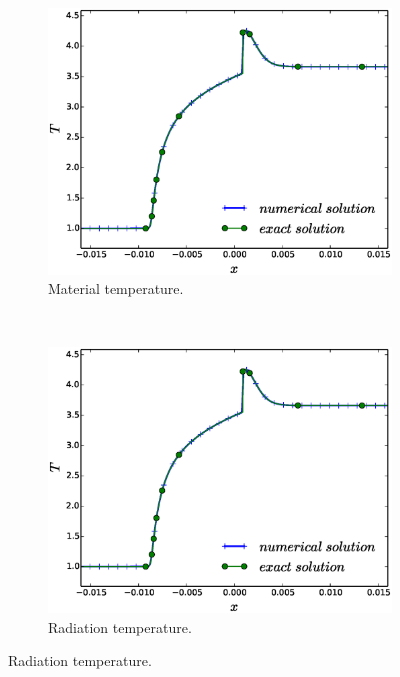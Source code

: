 \documentclass[times,doublespace]{fldauth}%
\begin{document}
\begin{figure}[h]
    \begin{subfigure}{0.32\textwidth}
    \centering
    \includegraphics[width=\linewidth]{figures/dpt-xs/mach-3-mat-temp-nel-1000-plot.eps}
    \caption{Material temperature.}\label{fig:mach-3-dpt-xs-mat-temp}
    \end{subfigure}
    ~
    \begin{subfigure}{0.32\textwidth}
    \centering
    \includegraphics[width=\linewidth]{figures/dpt-xs/mach-3-mat-temp-nel-1000-plot.eps}
    \caption{Radiation temperature.}\label{fig:mach-3-dpt-xs-rad-temp}
    \end{subfigure}

\end{figure}
\end{document}
